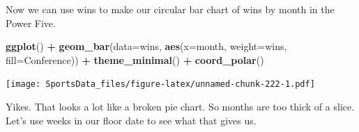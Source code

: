 \documentclass[]{book}
\newenvironment{Shaded}{\begin{snugshade}}{\end{snugshade}}
\newcommand{\DataTypeTok}[1]{\textcolor[rgb]{0.13,0.29,0.53}{#1}}
\newcommand{\KeywordTok}[1]{\textcolor[rgb]{0.13,0.29,0.53}{\textbf{#1}}}
\newcommand{\NormalTok}[1]{#1}
\newcommand{\OperatorTok}[1]{\textcolor[rgb]{0.81,0.36,0.00}{\textbf{#1}}}
\newcommand{\StringTok}[1]{\textcolor[rgb]{0.31,0.60,0.02}{#1}}
\begin{document}
\begin{Shaded}
\end{Shaded}

Now we can use wins to make our circular bar chart of wins by month in the Power Five.

\begin{Shaded}
\begin{Highlighting}[]
\KeywordTok{ggplot}\NormalTok{() }\OperatorTok{+}\StringTok{ }\KeywordTok{geom_bar}\NormalTok{(}\DataTypeTok{data=}\NormalTok{wins, }\KeywordTok{aes}\NormalTok{(}\DataTypeTok{x=}\NormalTok{month, }\DataTypeTok{weight=}\NormalTok{wins, }\DataTypeTok{fill=}\NormalTok{Conference)) }\OperatorTok{+}\StringTok{ }\KeywordTok{theme_minimal}\NormalTok{() }\OperatorTok{+}\StringTok{ }\KeywordTok{coord_polar}\NormalTok{()}
\end{Highlighting}
\end{Shaded}

\texttt{[image: SportsData\_files/figure-latex/unnamed-chunk-222-1.pdf]}

Yikes. That looks a lot like a broken pie chart. So months are too thick of a slice. Let's use weeks in our floor date to see what that gives us.

\begin{Shaded}
\end{Shaded}
\end{document}
